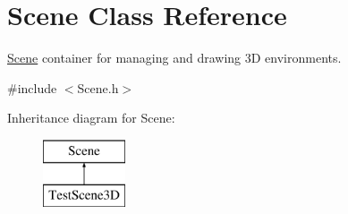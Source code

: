 \hypertarget{class_scene}{}\section{Scene Class Reference}
\label{class_scene}


\hyperlink{class_scene}{Scene} container for managing and drawing 3D environments.  




{\ttfamily \#include $<$Scene.\+h$>$}

Inheritance diagram for Scene\+:\begin{figure}[H]
\begin{center}
\leavevmode
\includegraphics[height=2.000000cm]{class_scene}
\end{center}
\end{figure}
